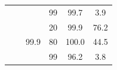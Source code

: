 \documentclass{article}
\begin{document}
\begin{table}
\begin{tabular}{|c|c|c|c|c|c|}
                                    &                                                                                        &                                                                                          & 99                                                                                      & 99.7                                                                      & 3.9                                                                       \\ \cline{3-6} 
                                    &                                                                                        & \multirow{3}{*}{99.9}                                                                    & 20                                                                                      & 99.9                                                                      & 76.2                                                                      \\ \cline{4-6} 
                                    &                                                                                        &                                                                                          & 80                                                                                      & 100.0                                                                     & 44.5                                                                      \\ \cline{4-6} 
                                    &                                                                                        &                                                                                          & 99                                                                                      & 96.2                                                                      & 3.8                                                                       \\ \hline
\end{tabular}
\label{resultados}
\end{table}
\end{document}
